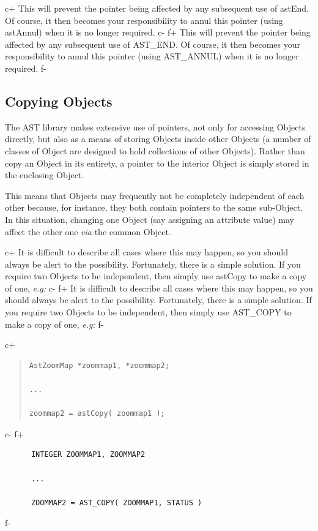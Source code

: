 \documentclass[twoside,11pt]{article}
\begin{document}
c+
This will prevent the pointer being affected by any subsequent use of
astEnd. Of course, it then becomes your responsibility to annul this
pointer (using astAnnul) when it is no longer required.
c-
f+
This will prevent the pointer being affected by any subsequent use of
AST\_END. Of course, it then becomes your responsibility to annul this
pointer (using AST\_ANNUL) when it is no longer required.
f-

\subsection{\label{ss:copyingobjects}Copying Objects}

The AST library makes extensive use of pointers, not only for
accessing Objects directly, but also as a means of storing Objects
inside other Objects (a number of classes of Object are designed to
hold collections of other Objects). Rather than copy an Object in its
entirety, a pointer to the interior Object is simply stored in the
enclosing Object.

This means that Objects may frequently not be completely independent
of each other because, for instance, they both contain pointers to the
same sub-Object. In this situation, changing one Object (say assigning
an attribute value) may affect the other one {\em{via}} the common
Object.

c+
It is difficult to describe all cases where this may happen, so you
should always be alert to the possibility. Fortunately, there is a
simple solution. If you require two Objects to be independent, then
simply use astCopy to make a copy of one, {\em{e.g:}}
c-
f+
It is difficult to describe all cases where this may happen, so you
should always be alert to the possibility. Fortunately, there is a
simple solution. If you require two Objects to be independent, then
simply use AST\_COPY to make a copy of one, {\em{e.g:}}
f-

c+
\begin{quote}
\small
\begin{verbatim}
AstZoomMap *zoommap1, *zoommap2;

...

zoommap2 = astCopy( zoommap1 );
\end{verbatim}
\normalsize
\end{quote}
c-
f+
\small
\begin{verbatim}
      INTEGER ZOOMMAP1, ZOOMMAP2

      ...

      ZOOMMAP2 = AST_COPY( ZOOMMAP1, STATUS )
\end{verbatim}
\normalsize
f-
\end{document}
